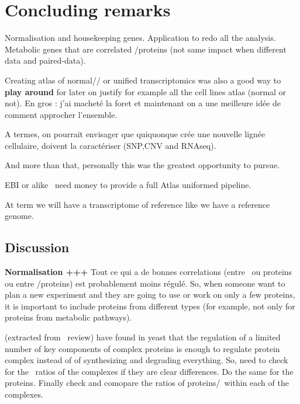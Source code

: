 \clearpage
\chapter{Concluding remarks}
\label{ch:conclusion}



Normalisation and housekeeping genes.
Application to redo all the analysis.
Metabolic genes that are correlated \mRNAs{}/proteins (not same impact when different data and
paired-data).




Creating atlas of normal// or unified transcriptomics was also a good way to
\textbf{play around} for later on justify for example all the cell lines atlas
(normal or not). En gros : j'ai macheté la foret et maintenant on a une meilleure
idée de comment approcher  l'ensemble.

A termes, on pourrait envisager que quiquonque crée une nouvelle lignée cellulaire,
doivent la caractériser (SNP,CNV and RNAseq).


And more than that, personally this was the greatest opportunity to pursue.



EBI or alike \rightarrow\ need money to provide a full Atlas uniformed pipeline.

At term we will have a transcriptome of reference like we have a reference genome.





\section{Discussion}

\textbf{Normalisation +++}
Tout ce qui a de bonnes correlations
(entre \mRNAs\ ou proteins ou entre \mRNAs/proteins)
est probablement moins régulé.
So, when someone want to plan a new experiment
and they are going to use or work on only a few proteins,
it is important to include proteins from different types
(for example, not only for proteins from metabolic pathways).


\cite{De_Lichtenberg2005-ka}
(extracted from~\cite{Liu2016-re} review)
have found in yeast that
the regulation of a limited number of key components of
complex proteins is enough to regulate protein complex
instead of of synthesizing and degrading everything.
So, need to check for the \mRNAs\ ratios of the complexes
if they are clear differences. Do the same for the proteins.
Finally check and comopare the ratios of proteins/\mRNAs\ within each of the complexes.

















